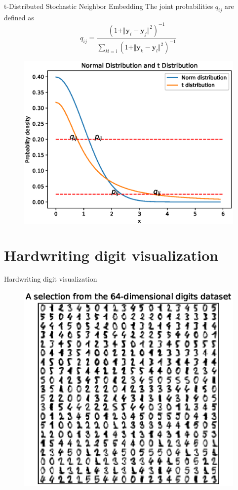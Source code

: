 \documentclass[10pt]{beamer}
\newcommand{\bol}[1]{\textbf{#1}}
\begin{document}
\begin{frame}{t-Distributed Stochastic Neighbor Embedding}
The joint probabilities $q_{ij}$ are defined as
\begin{displaymath}
	q_{ij} = \frac{(1 + \Vert \bol{y}_i - \bol{y}_j \Vert^2)^{-1}}{\sum_{k !=l}(1 + \Vert \bol{y}_k - \bol{y}_l \Vert^2)^{-1}}
\end{displaymath}
\begin{figure}
\centering
\includegraphics[scale=0.45]{./image/tsne5.eps}
\end{figure}
\end{frame}


\section{Hardwriting digit visualization}
\begin{frame}{Hardwriting digit visualization}
\begin{figure}
\centering
\includegraphics[scale=0.65]{./image/experiment/example.eps}
\end{figure}
\end{frame}
\end{document}
